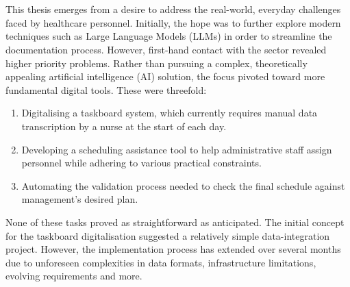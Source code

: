 \\
\\
This thesis emerges from a desire to address the real-world, everyday challenges faced by healthcare personnel. Initially, the hope was to further explore modern techniques such as Large Language Models (LLMs) in order to streamline the documentation process. However, first-hand contact with the sector revealed higher priority problems. Rather than pursuing a complex, theoretically appealing artificial intelligence (AI) solution, the focus pivoted toward more fundamental digital tools. These were threefold:
\begin{enumerate}
    \item Digitalising a taskboard system, which currently requires manual data transcription by a nurse at the start of each day.
    \item Developing a scheduling assistance tool to help administrative staff assign personnel while adhering to various practical constraints.
    \item Automating the validation process needed to check the final schedule against management's desired plan.
\end{enumerate}
None of these tasks proved as straightforward as anticipated. The initial concept for the taskboard digitalisation suggested a relatively simple data-integration project. However, the implementation process has extended over several months due to unforeseen complexities in data formats, infrastructure limitations, evolving requirements and more.

